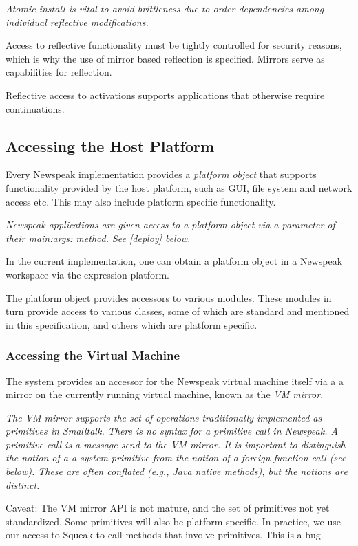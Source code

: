 \documentclass{article}
\newcommand{\code}[1]{{\sf #1}}
\begin{document}
{\it
Atomic install is vital to avoid brittleness due to order dependencies among individual reflective modifications.

Access to reflective functionality must be tightly controlled for security reasons, which is why the use of mirror based reflection is specified. Mirrors serve as capabilities for reflection.

Reflective access to activations supports applications that otherwise require continuations.
}

\subsection{Accessing the Host Platform}
\label{platform}

Every Newspeak implementation provides a {\em platform object} that supports functionality
provided by the host platform, such as GUI, file system and network access etc. This may also include platform specific functionality. 

{\it Newspeak applications are given access to a platform object via a parameter of their \code{main:args:} method. See \ref{deploy} below.

In the current implementation, one can obtain a platform object in a Newspeak workspace via the expression \code{platform}. 
}

The platform object provides accessors to various modules.  These modules in turn provide access to various classes, some of which are standard and mentioned in this specification, and others which are platform specific.


\subsubsection{Accessing the Virtual Machine}
\label{vm}

The system provides an accessor for the Newspeak virtual machine itself via a
a mirror on the currently running virtual machine, known as the {\em VM mirror}. 

{\it 
The VM mirror supports the set of operations traditionally implemented as primitives in Smalltalk. There is no syntax for a primitive call in Newspeak. A primitive call is a message send to the VM mirror.
It is important to distinguish the notion of a a system primitive from the notion of a foreign function call (see below). These are often conflated (e.g., Java native methods), but the notions are distinct.

Caveat: The VM mirror API is not mature, and the set of primitives not yet standardized. Some primitives will also be platform specific. In practice, we use our access to Squeak to call methods that involve primitives. This is a bug.
}
\end{document}
